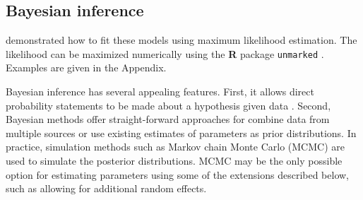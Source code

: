 \documentclass[12pt]{article}
\begin{document}




\subsection{Bayesian inference}

\citet{dail_madsen:2011} demonstrated how to fit these models using maximum 
likelihood estimation. The likelihood can be maximized numerically using the
\textbf{R} package \texttt{unmarked} \citep{fiske_chandler:2011}. Examples
are given in the Appendix.

Bayesian inference has several appealing features. First, it
allows direct probability statements to be made about a hypothesis
given data \citep{link_barker:2010}.    
Second, Bayesian methods offer straight-forward approaches for
combine data from multiple sources or use existing estimates of parameters as prior
distributions. In practice, simulation methods such as Markov
chain Monte Carlo (MCMC) are used to simulate the posterior
distributions. %
MCMC may be the only possible option for estimating parameters
using some of the extensions described below, such as allowing for
additional random effects.
\end{document}
